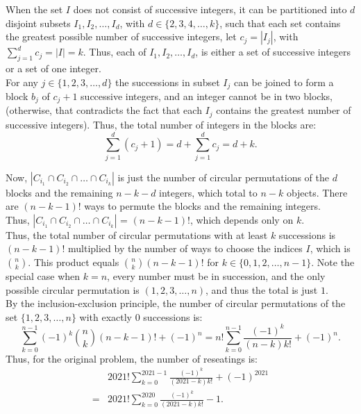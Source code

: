 \documentclass{article}
\begin{document}
When the set $I$ does not consist of successive integers, it can be partitioned into $d$ disjoint subsets $I_1,I_2,\dots , I_d$, with $d\in \{ 2,3,4,\dots,k \}$, such that each set contains the greatest possible number of successive integers, let $c_j = |I_j|$, with $\sum_{j=1}^d c_j = |I| = k$. Thus, each of $I_1,I_2,\dots , I_d$, is either a set of successive integers or a set of one integer. \\
For any $j\in \{1,2,3,\dots , d \}$ the successions in subset $I_j$ can be joined to form a block $b_j$ of $c_j + 1$ successive integers, and an integer cannot be in two blocks, (otherwise, that contradicts the fact that each $I_j$ contains the greatest number of successive integers). Thus, the total number of integers in the blocks are:
$$\sum_{j=1}^d (c_j + 1) = d + \sum_{j=1}^d c_j = d + k.$$

Now, $\left| C_{i_1}\cap C_{i_2} \cap \dots \cap C_{i_k} \right|$ is just the number of circular permutations of the $d$ blocks and the remaining $n-k-d$ integers, which total to $n-k$ objects. There are $(n-k-1)!$ ways to permute the blocks and the remaining integers. \\

Thus, $\left| C_{i_1}\cap C_{i_2} \cap \dots \cap C_{i_k} \right|$ =  $(n-k-1)!$, which depends only on $k$. \\

Thus, the total number of circular permutations with at least $k$ successions is $(n-k-1)!$ multiplied by the number of ways to choose the indices $I$, which is $\binom{n}{k}$. This product equals $\binom{n}{k}(n-k-1)!$ for $k\in \{0,1,2,\dots, n-1 \}$. Note the special case when $k = n$, every number must be in succession, and the only possible circular permutation is $(1,2,3,\dots , n)$, and thus the total is just $1$. \\

By the inclusion-exclusion principle, the number of circular permutations of the set $\{1,2,3,\dots , n\}$ with exactly 0 successions is:
$$ \sum_{k=0}^{n-1} (-1)^k \binom{n}{k}(n-k-1)! + (-1)^n = n!\sum_{k=0}^{n-1} \frac{(-1)^k}{(n-k)k!} + (-1)^n.$$
Thus, for the original problem, the number of reseatings is:
\begin{align*}
    &2021!\sum_{k=0}^{2021-1} \frac{(-1)^k}{(2021-k)k!} + (-1)^{2021} \\
    = &\boxed{2021!\sum_{k=0}^{2020} \frac{(-1)^k}{(2021-k)k!} -1}.
\end{align*} 
\end{document}
